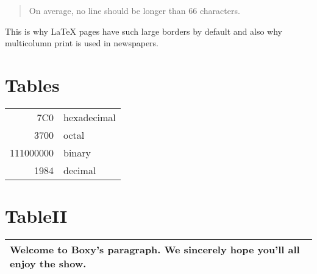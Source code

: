 \documentclass[a4paper, 11pt]{article}
\begin{document}
\begin{quote}
  On average, no line should be longer than 66 characters.
\end{quote}

This is why \LaTeX{} pages have such large borders by default and %
also why multicolumn print is used in newspapers.

\section{Tables}
\flushright
\begin{tabular}{|r|l|}
\hline
7C0 & hexadecimal \\ %
3700 & octal \\
\cline{2-2} %
111000000 & binary \\

\hline \hline %
1984 & decimal \\
\hline
\end{tabular}

\section{TableII}
\flushleft
\begin{tabular}{|p{4.7cm}|} %
\hline
Welcome to Boxy's paragraph.
We sincerely hope you'll all enjoy the show. \\%
\hline %
\end{tabular}
\end{document}
